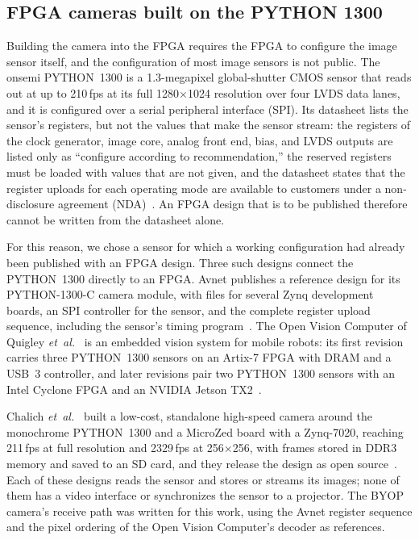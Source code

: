 \documentclass[10pt,journal,compsoc]{IEEEtran}
\newcommand{\SI}[2]{#1\,#2}
\begin{document}
\subsection{FPGA cameras built on the PYTHON 1300}
Building the camera into the FPGA requires the FPGA to configure the image sensor itself, and the
configuration of most image sensors is not public. The onsemi PYTHON~1300 is a 1.3-megapixel
global-shutter CMOS sensor that reads out at up to \SI{210}{fps} at its full 1280$\times$1024
resolution over four LVDS data lanes, and it is configured over a serial peripheral interface
(SPI). Its datasheet lists the sensor's registers, but not the values that make the sensor
stream: the registers of the clock generator, image core, analog front end, bias, and LVDS
outputs are listed only as ``configure according to recommendation,'' the reserved registers must
be loaded with values that are not given, and the datasheet states that the register uploads for
each operating mode are available to customers under a non-disclosure agreement
(NDA)~\cite{onsemi_python1300}. An FPGA design that is to be published therefore cannot be written
from the datasheet alone.

For this reason, we chose a sensor for which a working configuration had already been published
with an FPGA design. Three such designs connect the PYTHON~1300 directly to an FPGA. Avnet
publishes a reference design for its PYTHON-1300-C camera module, with files for several Zynq
development boards, an SPI controller for the sensor, and the complete register upload sequence,
including the sensor's timing program~\cite{avnet_hdl}. The Open Vision Computer of Quigley
\emph{et~al.}~\cite{quigley2019ovc} is an embedded vision system for mobile robots: its first
revision carries three PYTHON~1300 sensors on an Artix-7 FPGA with DRAM and a USB~3 controller,
and later revisions pair two PYTHON~1300 sensors with an Intel Cyclone FPGA and an NVIDIA Jetson
TX2~\cite{osrf_ovc}.

Chalich \emph{et~al.}~\cite{chalich2020lowcost} built a low-cost, standalone high-speed camera
around the monochrome PYTHON~1300 and a MicroZed board with a Zynq-7020, reaching \SI{211}{fps}
at full resolution and \SI{2329}{fps} at 256$\times$256, with frames stored in DDR3 memory and
saved to an SD card, and they release the design as open source~\cite{hfrc}. Each of these designs
reads the sensor and stores or streams its images; none of them has a video interface or
synchronizes the sensor to a projector. The BYOP camera's receive path was written for this work,
using the Avnet register sequence and the pixel ordering of the Open Vision Computer's decoder as
references.
\end{document}
